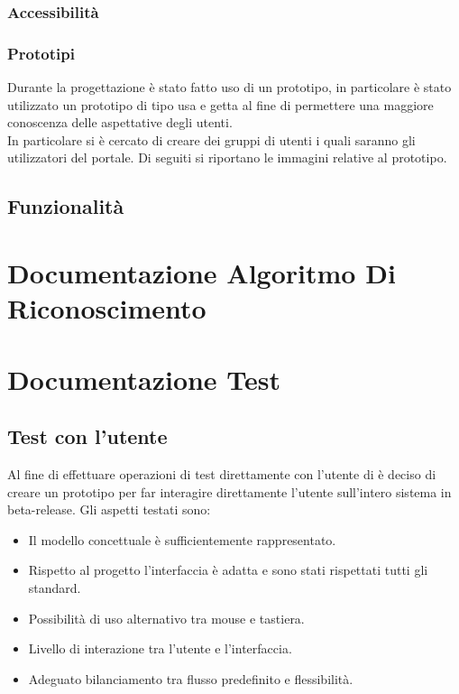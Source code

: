 \documentclass[a4paper,final,12pt]{report}
\begin{document}
\subsection{Accessibilità}

\subsection{Prototipi}
Durante la progettazione è stato fatto uso di un prototipo, in particolare è stato utilizzato un prototipo di tipo usa e getta al fine di permettere una maggiore conoscenza delle aspettative degli utenti.\\
In particolare si è cercato di creare dei gruppi di utenti i quali saranno gli utilizzatori del portale. Di seguiti si riportano le immagini relative al prototipo.

\section{Funzionalità}




\chapter{Documentazione Algoritmo Di Riconoscimento}

\chapter{Documentazione Test}




\section{Test con l'utente}
Al fine di effettuare operazioni di test direttamente con l'utente di è deciso di creare un prototipo per far interagire direttamente l'utente sull'intero sistema in beta-release.
Gli aspetti testati sono:
\begin{itemize}
\item Il modello concettuale è sufficientemente rappresentato.
\item Rispetto al progetto l'interfaccia è adatta e sono stati rispettati tutti gli standard.
\item Possibilità di uso alternativo tra mouse e tastiera.
\item Livello di interazione tra l'utente e l'interfaccia.
\item Adeguato bilanciamento tra flusso predefinito e flessibilità.
\end{itemize}
\end{document}
